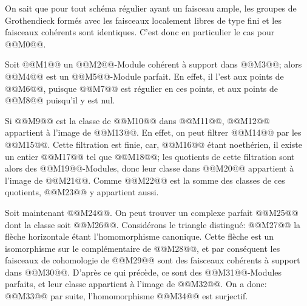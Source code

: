 
On
sait que pour tout schéma régulier ayant un faisceau ample, les groupes de Grothendieck formés avec les faisceaux localement libres de type fini et les faisceaux cohérents sont identiques. C'est donc en particulier le cas pour @@M0@@.

Soit @@M1@@ un @@M2@@-Module cohérent à support dans @@M3@@; alors @@M4@@ est un @@M5@@-Module parfait. En effet, il l'est aux points de @@M6@@, puisque @@M7@@ est régulier en ces points, et aux points de @@M8@@ puisqu'il y est nul.

Si @@M9@@ est la classe de @@M10@@ dans @@M11@@, @@M12@@ appartient à l'image de @@M13@@. En effet, on peut filtrer @@M14@@ par les @@M15@@. Cette filtration est finie, car, @@M16@@ étant noethérien, il existe un entier @@M17@@ tel que @@M18@@; les quotients de cette filtration sont alors des @@M19@@-Modules, donc leur classe dans @@M20@@ appartient à l'image de @@M21@@. Comme @@M22@@ est la somme des classes de ces quotients, @@M23@@ y appartient aussi.

Soit maintenant @@M24@@. On peut trouver un complexe parfait @@M25@@ dont la classe soit @@M26@@. Considérons le triangle distingué:
@@M27@@
la flèche horizontale étant l'homomorphisme canonique. Cette flèche est un isomorphisme sur le complémentaire de @@M28@@, et par conséquent les faisceaux de cohomologie de @@M29@@ sont des faisceaux cohérents à support dans @@M30@@. D'après ce qui précède, ce sont des @@M31@@-Modules parfaits, et leur classe appartient à l'image de @@M32@@. On a donc:
@@M33@@
par suite, l'homomorphisme @@M34@@ est surjectif.



\providecommand{\Q}{\mathbb Q}
\providecommand{\bfP}{\mathbf P}
\providecommand{\gr}{\operatorname{gr}}
\providecommand{\Id}{\operatorname{Id}}
\providecommand{\Fil}{\operatorname{Fil}}
\providecommand{\Imf}{\operatorname{Im}}
\providecommand{\rank}{\operatorname{rank}}
\providecommand{\codim}{\operatorname{codim}}
\providecommand{\cJ}{\mathcal J}
\providecommand{\cI}{\mathcal I}
\providecommand{\cN}{\mathcal N}
\providecommand{\cE}{\mathcal E}
\providecommand{\cO}{\mathcal O}


